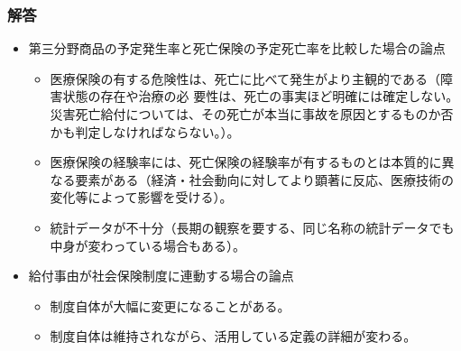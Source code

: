 \documentclass[report,gutter=10mm,fore-edge=10mm,uplatex,dvipdfmx]{jlreq}
\begin{document}
\subsubsection{解答}
\begin{itemize}
 \item 第三分野商品の予定発生率と死亡保険の予定死亡率を比較した場合の論点
\begin{itemize}
 \item 医療保険の有する危険性は、死亡に比べて発生がより主観的である（障害状態の存在や治療の必
要性は、死亡の事実ほど明確には確定しない。災害死亡給付については、その死亡が本当に事故を原因とするものか否かも判定しなければならない。）。
 \item 医療保険の経験率には、死亡保険の経験率が有するものとは本質的に異なる要素がある（経済・社会動向に対してより顕著に反応、医療技術の変化等によって影響を受ける）。
 \item 統計データが不十分（長期の観察を要する、同じ名称の統計データでも中身が変わっている場合もある）。
\end{itemize}
 \item 給付事由が社会保険制度に連動する場合の論点
\begin{itemize}
 \item 制度自体が大幅に変更になることがある。
 \item 制度自体は維持されながら、活用している定義の詳細が変わる。
\end{itemize}
\end{itemize}
\end{document}
